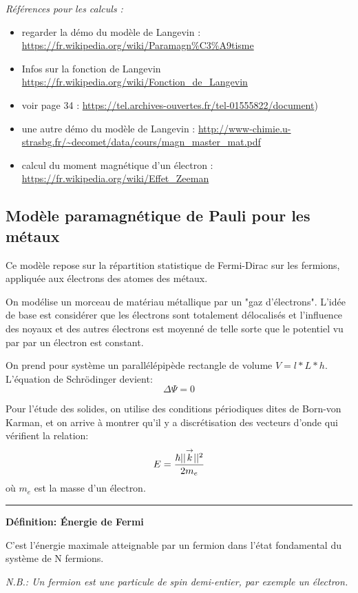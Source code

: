 \documentclass{article}
\begin{document}
\emph{Références pour les calculs : }
\begin{itemize}
    \item regarder la démo du modèle de Langevin  : \url{https://fr.wikipedia.org/wiki/Paramagn%C3%A9tisme}
    \item Infos sur la fonction de Langevin \url{https://fr.wikipedia.org/wiki/Fonction_de_Langevin}
    \item voir page 34 :  \url{https://tel.archives-ouvertes.fr/tel-01555822/document})
    \item une autre démo du modèle de Langevin : \url{http://www-chimie.u-strasbg.fr/~decomet/data/cours/magn_master_mat.pdf}
    \item calcul du moment magnétique d'un électron : \url{https://fr.wikipedia.org/wiki/Effet_Zeeman}
\end{itemize} 

\subsection{Modèle paramagnétique de Pauli pour les métaux}
Ce modèle repose sur la répartition statistique de Fermi-Dirac sur les fermions, appliquée aux électrons des atomes des métaux. 

On modélise un morceau de matériau métallique par un "gaz d'électrons". L’idée de base est considérer que les électrons sont totalement délocalisés et l’influence des noyaux et des autres électrons est moyenné de telle sorte que le potentiel vu par par un électron est constant. 

On prend pour système un parallélépipède rectangle de volume $V = l*L*h$.
L'équation de Schrödinger devient:
$$\Delta \Psi = 0$$

Pour l'étude des solides, on utilise des conditions périodiques dites de Born-von Karman, et on arrive à montrer qu'il y a discrétisation des vecteurs d'onde qui vérifient la relation:
$$E = \frac{\hbar ||\overset{\to}{k}||^2}{2m_e}$$
où $m_e$ est la masse d'un électron.

\rule{\textwidth}{0.4pt}

\begin{center}
\textbf{Définition: Énergie de Fermi}
    
    C’est l’énergie maximale atteignable par un fermion dans l’état fondamental du système de N fermions.

\emph{N.B.: Un fermion est une particule de spin demi-entier, par exemple un électron.}    
\end{center}
\end{document}
